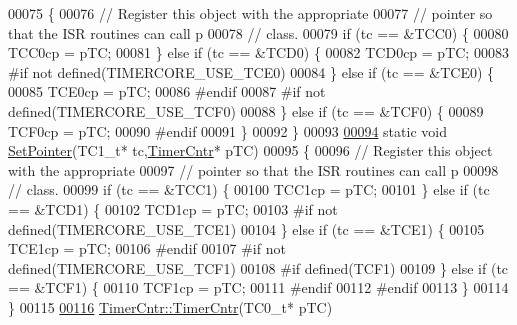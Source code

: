 \begin{DoxyCode}
00075 \{
00076     \textcolor{comment}{// Register this object with the appropriate}
00077     \textcolor{comment}{// pointer so that the ISR routines can call p}
00078     \textcolor{comment}{// class.}
00079     \textcolor{keywordflow}{if} (tc == &TCC0) \{
00080         TCC0cp = pTC;
00081     \} \textcolor{keywordflow}{else} \textcolor{keywordflow}{if} (tc == &TCD0) \{
00082         TCD0cp = pTC;
00083 \textcolor{preprocessor}{#if not defined(TIMERCORE\_USE\_TCE0)}
00084 \textcolor{preprocessor}{}    \} \textcolor{keywordflow}{else} \textcolor{keywordflow}{if} (tc == &TCE0) \{
00085         TCE0cp = pTC;
00086 \textcolor{preprocessor}{#endif}
00087 \textcolor{preprocessor}{}\textcolor{preprocessor}{#if not defined(TIMERCORE\_USE\_TCF0)}
00088 \textcolor{preprocessor}{}    \} \textcolor{keywordflow}{else} \textcolor{keywordflow}{if} (tc == &TCF0) \{
00089         TCF0cp = pTC;
00090 \textcolor{preprocessor}{#endif}
00091 \textcolor{preprocessor}{}    \}
00092 \}
00093 
\hypertarget{_timer_cntr_8cpp_source_l00094}{}\hyperlink{_timer_cntr_8cpp_acb2dde5ac0f74a08d831eb548afb26bd}{00094} \textcolor{keyword}{static} \textcolor{keywordtype}{void} \hyperlink{_hardware_serial_8cpp_aaec4e4f887a958cc22dd447565d7080b}{SetPointer}(TC1\_t* tc,\hyperlink{class_timer_cntr}{TimerCntr}* pTC)
00095 \{
00096     \textcolor{comment}{// Register this object with the appropriate}
00097     \textcolor{comment}{// pointer so that the ISR routines can call p}
00098     \textcolor{comment}{// class.}
00099     \textcolor{keywordflow}{if} (tc == &TCC1) \{
00100         TCC1cp = pTC;
00101     \} \textcolor{keywordflow}{else} \textcolor{keywordflow}{if} (tc == &TCD1) \{
00102         TCD1cp = pTC;
00103 \textcolor{preprocessor}{#if not defined(TIMERCORE\_USE\_TCE1)}
00104 \textcolor{preprocessor}{}    \} \textcolor{keywordflow}{else} \textcolor{keywordflow}{if} (tc == &TCE1) \{
00105         TCE1cp = pTC;
00106 \textcolor{preprocessor}{#endif}
00107 \textcolor{preprocessor}{}\textcolor{preprocessor}{#if not defined(TIMERCORE\_USE\_TCF1)}
00108 \textcolor{preprocessor}{}\textcolor{preprocessor}{#if defined(TCF1)}
00109 \textcolor{preprocessor}{}    \} \textcolor{keywordflow}{else} \textcolor{keywordflow}{if} (tc == &TCF1) \{
00110         TCF1cp = pTC;
00111 \textcolor{preprocessor}{#endif}
00112 \textcolor{preprocessor}{}\textcolor{preprocessor}{#endif}
00113 \textcolor{preprocessor}{}    \}
00114 \}
00115 
\hypertarget{_timer_cntr_8cpp_source_l00116}{}\hyperlink{class_timer_cntr_ad03f5cb857585c26d62eee0667a3c37c}{00116} \hyperlink{class_timer_cntr_ad03f5cb857585c26d62eee0667a3c37c}{TimerCntr::TimerCntr}(TC0\_t*  pTC)

\end{DoxyCode}

